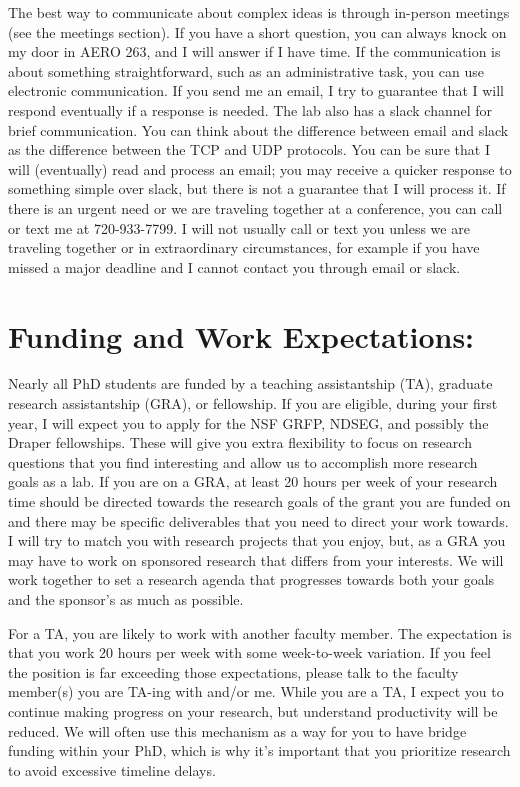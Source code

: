 \documentclass[11pt,letterpaper]{article}
\begin{document}
The best way to communicate about complex ideas is through in-person meetings (see the meetings section). If you have a short question, you can always knock on my door in AERO 263, and I will answer if I have time. If the communication is about something straightforward, such as an administrative task, you can use electronic communication. If you send me an email, I try to guarantee that I will respond eventually if a response is needed. The lab also has a slack channel for brief communication. You can think about the difference between email and slack as the difference between the TCP and UDP protocols. You can be sure that I will (eventually) read and process an email; you may receive a quicker response to something simple over slack, but there is not a guarantee that I will process it. If there is an urgent need or we are traveling together at a conference, you can call or text me at 720-933-7799. I will not usually call or text you unless we are traveling together or in extraordinary circumstances, for example if you have missed a major deadline and I cannot contact you through email or slack.

\section{Funding and Work Expectations:} Nearly all PhD students are funded by a teaching assistantship (TA), graduate research assistantship (GRA), or fellowship. If you are eligible, during your first year, I will expect you to apply for the NSF GRFP, NDSEG, and possibly the Draper fellowships. These will give you extra flexibility to focus on research questions that you find interesting and allow us to accomplish more research goals as a lab. If you are on a GRA, at least 20 hours per week of your research time should be directed towards the research goals of the grant you are funded on and there may be specific deliverables that you need to direct your work towards. I will try to match you with research projects that you enjoy, but, as a GRA you may have to work on sponsored research that differs from your interests. We will work together to set a research agenda that progresses towards both your goals and the sponsor's as much as possible.

For a TA, you are likely to work with another faculty member. The expectation is that you work 20 hours per week with some week-to-week variation. If you feel the position is far exceeding those expectations, please talk to the faculty member(s) you are TA-ing with and/or me. While you are a TA, I expect you to continue making progress on your research, but understand productivity will be reduced. We will often use this mechanism as a way for you to have bridge funding within your PhD, which is why it's important that you prioritize research to avoid excessive timeline delays.
\end{document}
